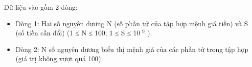 Dữ liệu vào gồm 2 dòng:  
\begin{itemize}
	\item     Dòng 1: Hai số nguyên dương N (số phần tử của tập hợp mệnh giá tiền) và S (số tiền cần đổi) (1 ≤ N ≤ 100; 1 ≤ S ≤ 10    $^     9    $    ).   
	\item     Dòng 2: N số nguyên dương biểu thị mệnh giá của các phần tử trong tập hợp (giá trị không vượt quá 100).   
\end{itemize}
